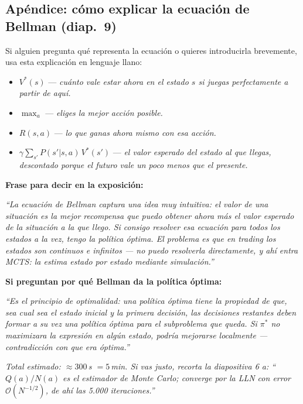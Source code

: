 \documentclass[11pt,a4paper]{article}
\begin{document}
\subsection*{Apéndice: cómo explicar la ecuación de Bellman (diap.\ 9)}

\noindent
Si alguien pregunta qué representa la ecuación o quieres introducirla
brevemente, usa esta explicación en lenguaje llano:

\begin{itemize}\setlength{\itemsep}{2pt}
  \item $V^*(s)$ --- \emph{cuánto vale estar ahora en el estado $s$ si
        juegas perfectamente a partir de aquí.}
  \item $\max_a$ --- \emph{eliges la mejor acción posible.}
  \item $R(s,a)$ --- \emph{lo que ganas ahora mismo con esa acción.}
  \item $\gamma\sum_{s'}P(s'|s,a)\,V^*(s')$ --- \emph{el valor esperado
        del estado al que llegas, descontado porque el futuro vale un
        poco menos que el presente.}
\end{itemize}

\medskip
\noindent\textbf{Frase para decir en la exposición:}

\medskip
\noindent\textit{``La ecuación de Bellman captura una idea muy intuitiva:
el valor de una situación es la mejor recompensa que puedo obtener ahora
más el valor esperado de la situación a la que llego.
Si consigo resolver esa ecuación para todos los estados a la vez, tengo
la política óptima.
El problema es que en trading los estados son continuos e infinitos ---
no puedo resolverla directamente, y ahí entra MCTS: la estima estado
por estado mediante simulación.''}

\medskip
\noindent\textbf{Si preguntan por qué Bellman da la política óptima:}

\medskip
\noindent\textit{``Es el principio de optimalidad: una política óptima
tiene la propiedad de que, sea cual sea el estado inicial y la primera
decisión, las decisiones restantes deben formar a su vez una política
óptima para el subproblema que queda.
Si $\pi^*$ no maximizara la expresión en algún estado, podría mejorarse
localmente --- contradicción con que era óptima.''}

\bigskip
\noindent\textit{Total estimado: $\approx 300$\,s $= 5$\,min.
Si vas justo, recorta la diapositiva 6 a:
``$Q(a)/N(a)$ es el estimador de Monte Carlo; converge por la LLN con
error $\mathcal{O}(N^{-1/2})$, de ahí las 5.000 iteraciones.''}
\end{document}
